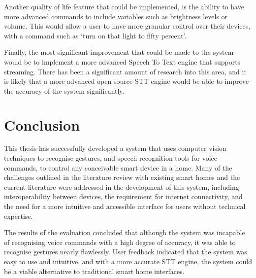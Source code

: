 Another quality of life feature that could be implemented, is the ability to have more advanced commands to include variables such as brightness levels or volume.
This would allow a user to have more granular control over their devices, with a command such as `turn on that light to fifty percent'.

Finally, the most significant improvement that could be made to the system would be to implement a more advanced Speech To Text engine that supports streaming.
There has been a significant amount of research into this area, and it is likely that a more advanced open source STT engine would be able to improve the accuracy of the system significantly.

\section{Conclusion}

This thesis has successfully developed a system that uses computer vision techniques to recognise gestures, and speech recognition tools for voice commands, to control any conceivable smart device in a home.
Many of the challenges outlined in the literature review with existing smart homes and the current literature were addressed in the development of this system, including interoperability between devices, the requirement for internet connectivity, and the need for a more intuitive and accessible interface for users without technical expertise.

The results of the evaluation concluded that although the system was incapable of recognising voice commands with a high degree of accuracy, it was able to recognise gestures nearly flawlessly.
User feedback indicated that the system was easy to use and intuitive, and with a more accurate STT engine, the system could be a viable alternative to traditional smart home interfaces.